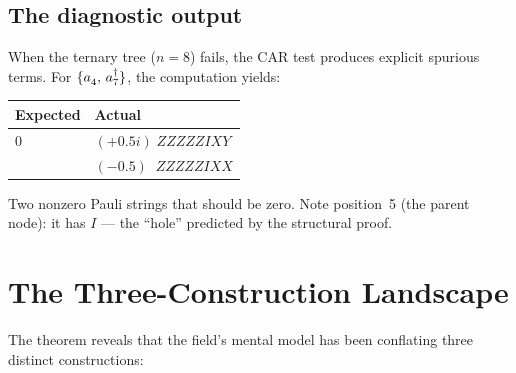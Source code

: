 \documentclass[11pt,a4paper]{article}
\newcommand{\ad}[1]{a_{#1}^{\dagger}}
\newcommand{\an}[1]{a_{#1}^{\vphantom{\dagger}}}
\newcommand{\acomm}[2]{\{#1,\,#2\}}
\theoremstyle{definition}
\begin{document}
\subsection{The diagnostic output}

When the ternary tree ($n = 8$) fails, the CAR test produces explicit
spurious terms.  For $\acomm{\an{4}}{\ad{7}}$, the computation yields:

\begin{center}
\begin{tabular}{@{}ll@{}}
\toprule
Expected & Actual \\
\midrule
$0$ & $(+0.5i)\; ZZZZZIXY$ \\
    & $(-0.5)\;\; ZZZZZIXX$ \\
\bottomrule
\end{tabular}
\end{center}

Two nonzero Pauli strings that should be zero.  Note position~5
(the parent node): it has $I$ --- the ``hole'' predicted by the
structural proof.

\section{The Three-Construction Landscape}
\label{sec:landscape}

The theorem reveals that the field's mental model has been conflating
three distinct constructions:
\end{document}

